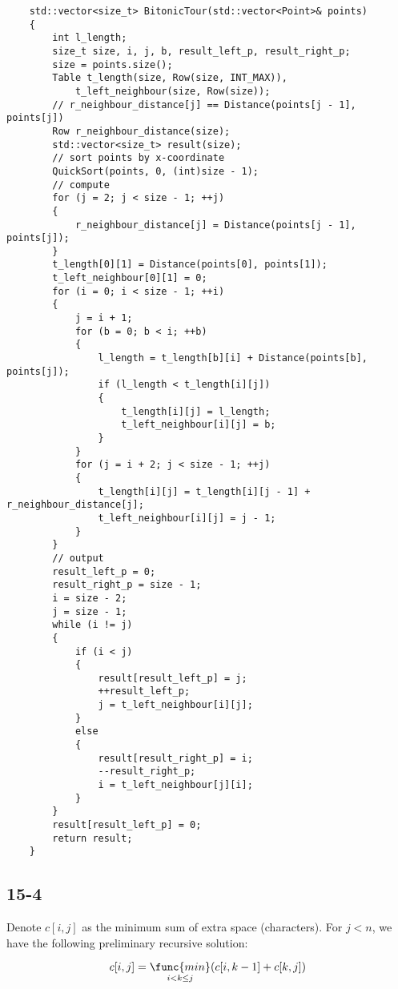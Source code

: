 \begin{verbatim}
    std::vector<size_t> BitonicTour(std::vector<Point>& points)
    {
        int l_length;
        size_t size, i, j, b, result_left_p, result_right_p;
        size = points.size();
        Table t_length(size, Row(size, INT_MAX)),
            t_left_neighbour(size, Row(size));
        // r_neighbour_distance[j] == Distance(points[j - 1], points[j])
        Row r_neighbour_distance(size);
        std::vector<size_t> result(size);
        // sort points by x-coordinate
        QuickSort(points, 0, (int)size - 1);
        // compute
        for (j = 2; j < size - 1; ++j)
        {
            r_neighbour_distance[j] = Distance(points[j - 1], points[j]);
        }
        t_length[0][1] = Distance(points[0], points[1]);
        t_left_neighbour[0][1] = 0;
        for (i = 0; i < size - 1; ++i)
        {
            j = i + 1;
            for (b = 0; b < i; ++b)
            {
                l_length = t_length[b][i] + Distance(points[b], points[j]);
                if (l_length < t_length[i][j])
                {
                    t_length[i][j] = l_length;
                    t_left_neighbour[i][j] = b;
                }
            }
            for (j = i + 2; j < size - 1; ++j)
            {
                t_length[i][j] = t_length[i][j - 1] + r_neighbour_distance[j];
                t_left_neighbour[i][j] = j - 1;
            }
        }
        // output
        result_left_p = 0;
        result_right_p = size - 1;
        i = size - 2;
        j = size - 1;
        while (i != j)
        {
            if (i < j)
            {
                result[result_left_p] = j;
                ++result_left_p;
                j = t_left_neighbour[i][j];
            }
            else
            {
                result[result_right_p] = i;
                --result_right_p;
                i = t_left_neighbour[j][i];
            }
        }
        result[result_left_p] = 0;
        return result;
    }
\end{verbatim}

\subsection*{15-4}

\noindent
Denote $c[i, j]$ as the minimum sum of extra space (characters).
For $j < n$, we have the following preliminary recursive solution:

\begin{equation*}
    c[i,j] = \mathop{\func{min}}\limits_{i < k \leq j}
        (c[i,k-1] + c[k,j])
\end{equation*}

